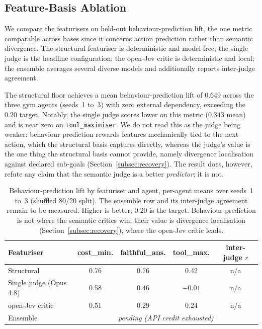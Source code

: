 \subsection{Feature-Basis Ablation}
\label{subsec:ablation}
We compare the featurisers on held-out behaviour-prediction lift, the one metric
comparable across bases since it concerns action prediction rather than semantic
divergence. The structural featuriser is deterministic and model-free; the single
judge is the headline configuration; the open-Jev critic is deterministic and local;
the ensemble averages several diverse models and additionally reports inter-judge
agreement.

The structural floor achieves a mean behaviour-prediction lift of $0.649$ across the
three gym agents (seeds~1 to~3) with zero external dependency, exceeding the $0.20$
target. Notably, the single judge scores lower on this metric ($0.343$ mean) and is
near zero on \texttt{tool_maximiser}. We do not read this as the judge being weaker:
behaviour prediction rewards features mechanically tied to the next action, which the
structural basis captures directly, whereas the judge's value is the one thing the
structural basis cannot provide, namely divergence localisation against declared
sub-goals (Section~\ref{subsec:recovery}). The result does, however, refute any claim
that the semantic judge is a better \emph{predictor}; it is not.

\begin{table}[h]
\centering
\small
\begin{tabular}{@{}lcccc@{}}
\toprule
Featuriser & cost\_min. & faithful\_ans. & tool\_max. & inter-judge $r$ \\
\midrule
Structural & 0.76 & 0.76 & 0.42 & n/a \\
Single judge (Opus 4.8) & 0.58 & 0.46 & $-0.01$ & n/a \\
open-Jev critic & 0.51 & 0.29 & 0.24 & n/a \\
Ensemble & \multicolumn{4}{c}{\textit{pending (API credit exhausted)}} \\
\bottomrule
\end{tabular}
\caption{Behaviour-prediction lift by featuriser and agent, per-agent means over
seeds~1 to~3 (shuffled 80/20 split). The ensemble row and its inter-judge agreement
remain to be measured. Higher is better; $0.20$ is the target. Behaviour prediction
is not where the semantic critics win; their value is divergence localisation
(Section~\ref{subsec:recovery}), where the open-Jev critic leads.}
\label{tab:ablation}
\end{table}

